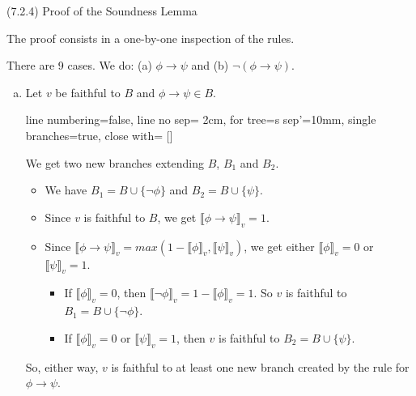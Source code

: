 \begin{frame}{(7.2.4)  Proof of the Soundness Lemma}

The proof consists in a one-by-one inspection of the rules.

There are 9 cases. We do: (a) $\phi\to\psi$ and (b) $\neg(\phi\to \psi)$.
		
		\begin{enumerate}[(a)]
					
		\item Let $v$ be faithful to $B$ and $\phi\to\psi\in B$.
		
					\begin{center}
					\begin{prooftree}
					{
					line numbering=false,
					line no sep= 2cm,
					for tree={s sep'=10mm},
					single branches=true,
					close with=\xmark
					}
					[\phi\to\psi [\neg \phi ] [\psi ] ]
					\end{prooftree}
					\end{center}
					
			We get two new branches extending $B$, $B_1$ and $B_2$. 
			
			\begin{itemize}
						
			\item We have $B_1=B\cup\{\neg\phi\}$ and $B_2=B\cup\{\psi\}$. 
			
			\item Since $v$ is faithful to $B$, we get $\llbracket\phi\to\psi\rrbracket_v=1$. 
			
			\item Since $\llbracket\phi\to\psi\rrbracket_v=max(1-\llbracket\phi\rrbracket_v,\llbracket\psi\rrbracket_v)$, we get either $\llbracket\phi\rrbracket_v=0$ or $\llbracket\psi\rrbracket_v=1$.
			
			\begin{itemize}
		
			\item If $\llbracket\phi\rrbracket_v=0$, then $\llbracket\neg\phi\rrbracket_v=1-\llbracket\phi\rrbracket_v=1$. So $v$ is faithful to $B_1=B\cup\{\neg\phi\}$. 
		
			\item If $\llbracket\phi\rrbracket_v=0$ or $\llbracket\psi\rrbracket_v=1$, then $v$ is faithful to $B_2=B\cup\{\psi\}$. 
	
		
			\end{itemize}
		
		\end{itemize}
	So, either way, $v$ is faithful to at least one new branch created by the rule for $\phi\to\psi$.
	
	\end{enumerate}
	
\end{frame}

